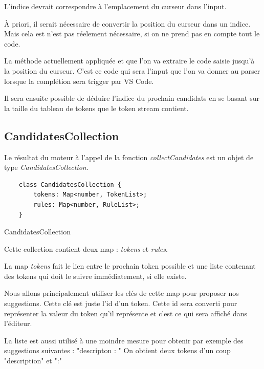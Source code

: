 \documentclass[
    iict, %
    il, %
]{heig-tb}
\begin{document}
L'indice devrait correspondre à l'emplacement du curseur dans l'input.

À priori, il serait nécessaire de convertir la position du curseur dans un indice.
Mais cela est n'est pas réelement nécessaire, si on ne prend pas en compte tout le code.

La méthode actuellement appliquée et que l'on va extraire le code saisie jusqu'à la position du curseur.
C'est ce code qui sera l'input que l'on va donner au parser lorsque la complétion sera trigger par VS Code.

Il sera ensuite possible de déduire l'indice du prochain candidats en se basant sur la taille du tableau de tokens que le token stream contient.


\subsection{CandidatesCollection}

Le résultat du moteur à l'appel de la fonction \emph{collectCandidates} est un objet de type \emph{CandidatesCollection}.

\begin{listing}[!ht]
    \begin{verbatim}
    class CandidatesCollection {
        tokens: Map<number, TokenList>;
        rules: Map<number, RuleList>;
    }
    \end{verbatim}
    \caption{CandidatesCollection}
    \label{CandidatesCollection}
\end{listing}

Cette collection contient deux map : \emph{tokens} et \emph{rules}.

La map \emph{tokens} fait le lien entre le prochain token possible et une liste contenant des tokens qui doit le suivre immédiatement, si elle existe.

Nous allons principalement utiliser les clés de cette map pour proposer nos suggestions.
Cette clé est juste l'id d'un token. Cette id sera converti pour représenter la valeur du token qu'il représente et c'est ce qui sera affiché dans l'éditeur.

La liste est aussi utilisé à une moindre mesure pour obtenir par exemple des suggestions suivantes : "descripton : "
On obtient deux tokens d'un coup "description" et ":"
\end{document}
